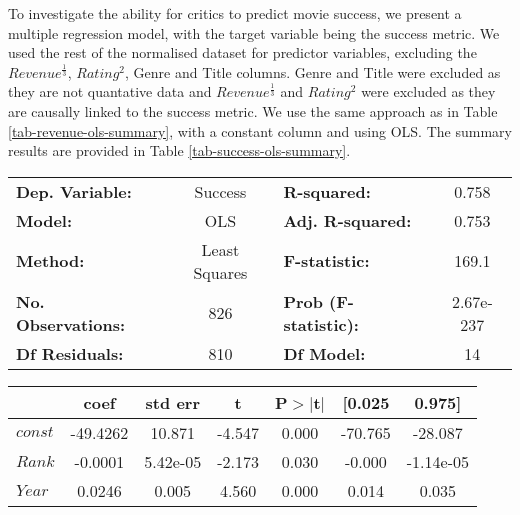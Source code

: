         To investigate the ability for critics to predict movie success, we present a multiple regression model,
            with the target variable being the success metric. 
        We used the rest of the normalised dataset for predictor variables, excluding the $Revenue^\frac{1}{3}$, $Rating^2$,
            Genre and Title columns.
        Genre and Title were excluded as they are not quantative data and $Revenue^\frac{1}{3}$ and $Rating^2$ were excluded
            as they are causally  linked to the success metric.
        We use the same approach as in Table \ref{tab-revenue-ols-summary}, with a constant column and using OLS.
        The summary results are provided in Table \ref{tab-success-ols-summary}.
        \begin{table}[H]
            \begin{center}
                \begin{tabular}{lclc}
                    \toprule
                    \textbf{Dep. Variable:}           &     Success      & \textbf{  R-squared:         } &     0.758   \\
                    \textbf{Model:}                   &       OLS        & \textbf{  Adj. R-squared:    } &     0.753   \\
                    \textbf{Method:}                  &  Least Squares   & \textbf{  F-statistic:       } &     169.1   \\
                    \textbf{No. Observations:}        &         826      & \textbf{  Prob (F-statistic):} & 2.67e-237   \\
                    \textbf{Df Residuals:}            &         810      & \textbf{Df Model:}             &       14     \\
                    \bottomrule
                \end{tabular}
                \begin{tabular}{lcccccc}
                                                    & \textbf{coef} & \textbf{std err} & \textbf{t} & \textbf{P$> |$t$|$} & \textbf{[0.025} & \textbf{0.975]}  \\
                    \midrule
                    \textbf{$const$}                &     -49.4262  &       10.871     &    -4.547  &         0.000        &      -70.765    &      -28.087     \\
                    \textbf{$Rank$}                 &      -0.0001  &     5.42e-05     &    -2.173  &         0.030        &       -0.000    &    -1.14e-05     \\
                    \textbf{$Year$}                 &       0.0246  &        0.005     &     4.560  &         0.000        &        0.014    &        0.035     \\

\end{tabular}
\end{center}
\end{table}
